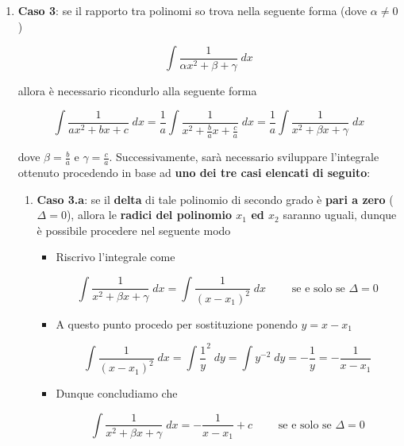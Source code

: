 \documentclass[a4paper, 12pt]{report}
\begin{document}
\begin{enumerate}
            \quad
            
            \item \textbf{Caso 3}: se il rapporto tra polinomi so trova nella seguente forma (dove $\alpha \neq 0$)
            
            \[ \int \frac{1}{\alpha x^2 + \beta + \gamma} \; dx\]
            
            allora è necessario ricondurlo alla seguente forma
            
            \[ \int \frac{1}{ax^2 + bx + c} \; dx = \frac{1}{a} \int \frac{1}{x^2 + \frac{b}{a}x + \frac{c}{a}} \; dx = \frac{1}{a} \int \frac{1}{x^2 + \beta x + \gamma} \; dx\]
            
            dove $\beta = \frac{b}{a}$ e $\gamma = \frac{c}{a}$. Successivamente, sarà necessario sviluppare l'integrale ottenuto procedendo in base ad \textbf{uno dei tre casi elencati di seguito}:
            
            \begin{enumerate}
                \item \textbf{Caso 3.a}: se il \textbf{delta} di tale polinomio di secondo grado è \textbf{pari a zero} ($\Delta = 0$), allora le \textbf{radici del polinomio $x_1$ ed $x_2$} saranno uguali, dunque è possibile procedere nel seguente modo
                
                \begin{itemize}
                    \item Riscrivo l'integrale come
                    
                    \[ \int \frac{1}{x^2 + \beta x + \gamma} \; dx = \int \frac{1}{(x-x_1)^2} \; dx \qquad \text{ se e solo se } \Delta = 0\]
                    
                    \item A questo punto procedo per sostituzione ponendo $y = x-x_1$
                    
                    \[ \int \frac{1}{(x-x_1)^2} \; dx = \int \frac{1}{y}^2 \; dy = \int y^{-2} \; dy = - \frac{1}{y} = - \frac{1}{x-x_1}\]
                    
                    \item Dunque concludiamo che
                    
                    \[ \int \frac{1}{x^2 + \beta x + \gamma} \; dx = - \frac{1}{x-x_1}+c \qquad \text{ se e solo se } \Delta = 0\]
                \end{itemize}
                

\end{enumerate}
\end{enumerate}
\end{document}
